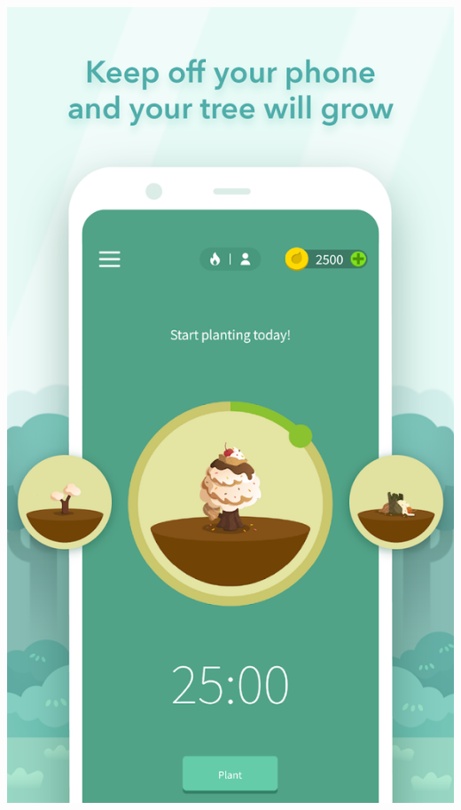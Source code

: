 \documentclass[11pt]{article}
\begin{document}
\begin{center}
\includegraphics[width=.9\linewidth]{./docs/2.png}
\end{center}
\end{document}

